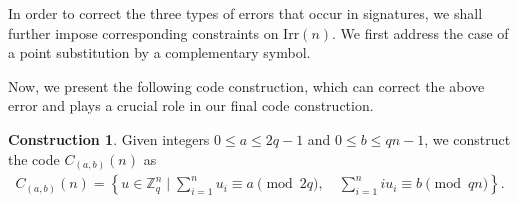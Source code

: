 \documentclass[pdflatex,sn-mathphys-num]{sn-jnl}
\theoremstyle{theorem}%
\theoremstyle{definition}
\theoremstyle{construction}
\newtheorem{construction}{Construction}
\newtheorem{open problem}{Open problem}
\begin{document}
In order to correct the three types of errors that occur in signatures, we shall further impose corresponding constraints on $\mathrm{Irr}(n)$. We first address the case of a point substitution by a complementary symbol. 

Now, we present the following code construction, which can correct the above error and plays a crucial role in our final code construction.
\begin{construction}\label{correct a complementary symbol}
Given integers $0\le a \le 2q-1$ and $0\le b\le qn-1$, we construct the code $C_{(a,b)}(n)$ as 
\begin{align}\label{Const1}
	C_{(a,b)}(n) = \left \{ u\in \mathbb{Z}_{q}^{n}\mid\sum_{i=1}^{n}u_{i} \equiv a \pmod {2q} ,\quad \sum_{i=1}^{n}iu_{i} \equiv b\pmod{qn}  \right \}. 
\end{align}
\end{construction}
\end{document}
